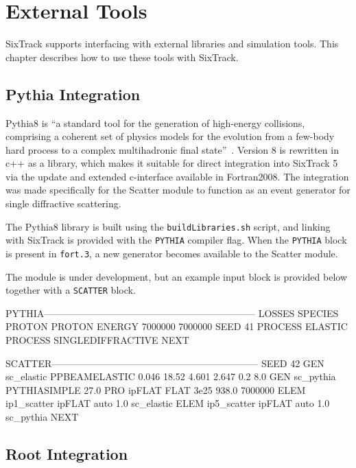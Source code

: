 
\chapter{External Tools} \label{ExtTools}

SixTrack supports interfacing with external libraries and simulation tools.
This chapter describes how to use these tools with SixTrack.

\section{Pythia Integration} \label{ExtPythia}

Pythia8 is ``a standard tool for the generation of high-energy collisions, comprising a coherent set of physics models for the evolution from a few-body hard process to a complex multihadronic final state''~\cite{pythia8}.
Version 8 is rewritten in c++ as a library, which makes it suitable for direct integration into SixTrack 5 via the update and extended c-interface available in Fortran2008.
The integration was made specifically for the Scatter module to function as an event generator for single diffractive scattering.

The Pythia8 library is built using the \texttt{buildLibraries.sh} script, and linking with SixTrack is provided with the \texttt{PYTHIA} compiler flag.
When the \texttt{PYTHIA} block is present in \texttt{fort.3}, a new generator becomes available to the Scatter module.

The module is under development, but an example input block is provided below together with a \texttt{SCATTER} block.

\begin{cverbatim}
PYTHIA------------------------------------------------------------------
  LOSSES
  SPECIES PROTON PROTON
  ENERGY 7000000 7000000
  SEED 41
  PROCESS ELASTIC
  PROCESS SINGLEDIFFRACTIVE
NEXT

SCATTER-----------------------------------------------------------------
  SEED 42
  GEN  sc_elastic  PPBEAMELASTIC 0.046  18.52  4.601  2.647  0.2  8.0
  GEN  sc_pythia   PYTHIASIMPLE  27.0
  PRO  ipFLAT      FLAT   3e25  938.0  7000000
  ELEM ip1_scatter ipFLAT auto 1.0 sc_elastic
  ELEM ip5_scatter ipFLAT auto 1.0 sc_pythia
NEXT
\end{cverbatim}

\section{Root Integration} \label{ExtRoot}

